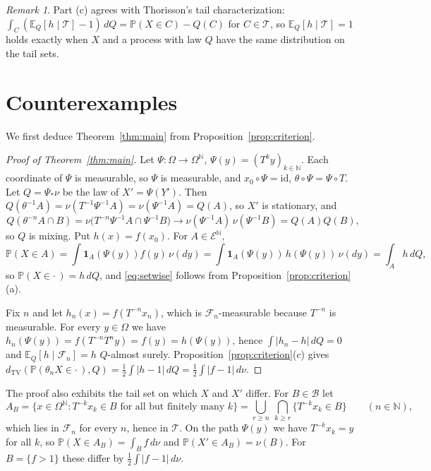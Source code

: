 \documentclass[11pt]{amsart}
\theoremstyle{definition}
\theoremstyle{remark}
\newtheorem{remark}[theorem]{Remark}
\newcommand{\N}{\mathbb N}
\newcommand{\E}{\mathbb E}
\newcommand{\Prob}{\mathbb P}
\newcommand{\cE}{\mathcal E}
\newcommand{\cF}{\mathcal F}
\newcommand{\cB}{\mathcal B}
\newcommand{\cT}{\mathcal T}
\newcommand{\dtv}{d_{\mathrm{TV}}}
\newcommand{\one}{\mathbf 1}
\begin{document}
\begin{remark}\label{rem:tail}
Part (c) agrees with Thorisson's tail characterization: $\int_C(\E_Q[h\mid\cT]-1)\,dQ=\Prob(X\in C)-Q(C)$ for
$C\in\cT$, so $\E_Q[h\mid\cT]=1$ holds exactly when $X$ and a process with law $Q$ have the same distribution on the
tail sets.
\end{remark}

\section{Counterexamples}\label{sec:examples}

We first deduce Theorem~\ref{thm:main} from Proposition~\ref{prop:criterion}.

\begin{proof}[Proof of Theorem~\ref{thm:main}]
Let $\Psi:\Omega\to\Omega^\N$, $\Psi(y)=(T^ky)_{k\in\N}$. Each coordinate of $\Psi$ is measurable, so $\Psi$ is
measurable, and $x_0\circ\Psi=\mathrm{id}$, $\theta\circ\Psi=\Psi\circ T$. Let $Q=\Psi_*\nu$ be the law of $X'=\Psi(Y')$.
Then $Q(\theta^{-1}A)=\nu(T^{-1}\Psi^{-1}A)=\nu(\Psi^{-1}A)=Q(A)$, so $X'$ is stationary, and
\[
Q(\theta^{-n}A\cap B)=\nu\bigl(T^{-n}\Psi^{-1}A\cap\Psi^{-1}B\bigr)\to\nu(\Psi^{-1}A)\,\nu(\Psi^{-1}B)=Q(A)Q(B),
\]
so $Q$ is mixing. Put $h(x)=f(x_0)$. For $A\in\cE^\N$,
\[
\Prob(X\in A)=\int\one_A(\Psi(y))f(y)\,\nu(dy)=\int\one_A(\Psi(y))\,h(\Psi(y))\,\nu(dy)=\int_A h\,dQ,
\]
so $\Prob(X\in\cdot\,)=h\,dQ$, and \eqref{eq:setwise} follows from Proposition~\ref{prop:criterion}(a).

Fix $n$ and let $h_n(x)=f(T^{-n}x_n)$, which is $\cF_n$-measurable because $T^{-n}$ is measurable. For every
$y\in\Omega$ we have $h_n(\Psi(y))=f(T^{-n}T^ny)=f(y)=h(\Psi(y))$, hence $\int|h_n-h|\,dQ=0$ and
$\E_Q[h\mid\cF_n]=h$ $Q$-almost surely. Proposition~\ref{prop:criterion}(c) gives
$\dtv(\Prob(\theta_nX\in\cdot\,),Q)=\frac12\int|h-1|\,dQ=\frac12\int|f-1|\,d\nu$.
\end{proof}

The proof also exhibits the tail set on which $X$ and $X'$ differ. For $B\in\cB$ let
\[
A_B=\bigl\{x\in\Omega^\N: T^{-k}x_k\in B\text{ for all but finitely many }k\bigr\}
=\bigcup_{r\ge n}\ \bigcap_{k\ge r}\{T^{-k}x_k\in B\}\qquad(n\in\N),
\]
which lies in $\cF_n$ for every $n$, hence in $\cT$. On the path $\Psi(y)$ we have $T^{-k}x_k=y$ for all $k$, so
$\Prob(X\in A_B)=\int_Bf\,d\nu$ and $\Prob(X'\in A_B)=\nu(B)$. For $B=\{f>1\}$ these differ by
$\frac12\int|f-1|\,d\nu$.
\end{document}
